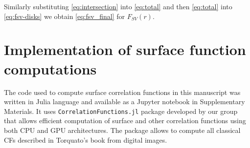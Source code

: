 \documentclass[reprint,amsmath,amssymb,aps,pre,showkeys,showpacs]{revtex4-1}
\newcommand{\code}[1]{\colorbox{light-gray}{\texttt{#1}}}
\begin{document}
Similarly substituting \cref{eq:intersection} into \cref{eq:total} and then
\cref{eq:total} into \cref{eq:fsv-disks} we obtain \cref{eq:fsv_final} for
$F_{SV}(r)$.

\section{Implementation of surface function computations}
\label{ap:b_code}
The code used to compute surface correlation functions in this manuscript was
written in Julia language and available as a Jupyter notebook in Supplementary
Materials. It uses \code{CorrelationFunctions.jl} package developed by our group
\cite{CFsjlpaper} that allows efficient computation of surface and other
correlation functions using both CPU and GPU architectures. The package allows
to compute all classical CFs described in Torquato’s book \cite{Torquato_book}
from digital images.


\end{document}
